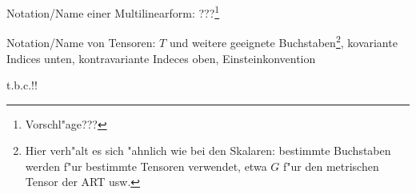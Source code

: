 \begin{list_sabina}
\begin{sub_list_sabina}
        \item
        \addtocounter{footnote}{-1}
        Notation/Name einer Multilinearform: ???\footnote{Vorschl"age???}%
        \item
        Notation/Name von Tensoren: $T$ und weitere geeignete Buchstaben\footnote{Hier 
        verh"alt es sich "ahnlich wie bei den Skalaren: bestimmte Buchstaben werden
        f"ur bestimmte Tensoren verwendet, etwa $G$ f"ur den metrischen Tensor der
        ART usw.}, 
        kovariante Indices unten, kontravariante Indeces oben, Einsteinkonvention
        \end{sub_list_sabina}
\end{list_sabina}


t.b.c.!!






























